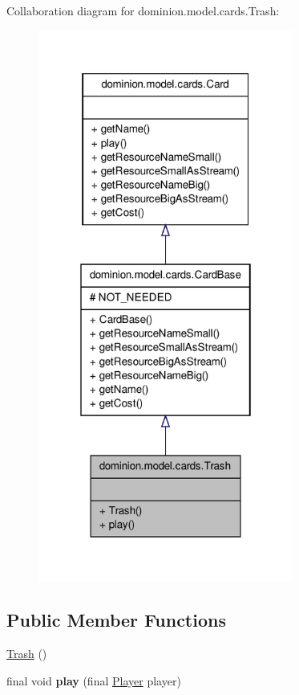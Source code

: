 \-Collaboration diagram for dominion.\-model.\-cards.\-Trash\-:
\nopagebreak
\begin{figure}[H]
\begin{center}
\leavevmode
\includegraphics[width=238pt]{classdominion_1_1model_1_1cards_1_1Trash__coll__graph}
\end{center}
\end{figure}
\subsection*{\-Public \-Member \-Functions}
\begin{DoxyCompactItemize}
\item 
\hyperlink{classdominion_1_1model_1_1cards_1_1Trash_a7796b723fe4604e2059621e1be975202}{\-Trash} ()
\item 
\hypertarget{classdominion_1_1model_1_1cards_1_1Trash_ab82b128337568115faeec94c39517045}{final void {\bfseries play} (final \hyperlink{interfacedominion_1_1model_1_1Player}{\-Player} player)}\label{classdominion_1_1model_1_1cards_1_1Trash_ab82b128337568115faeec94c39517045}

\end{DoxyCompactItemize}


